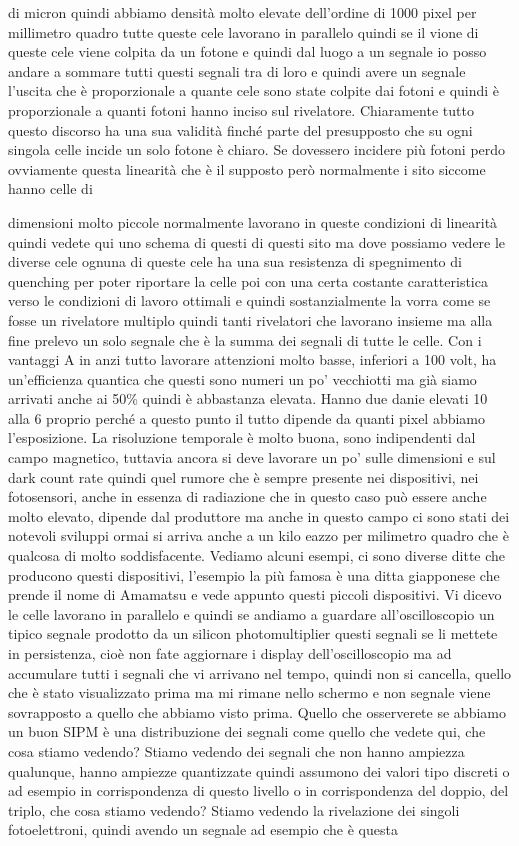 di micron quindi abbiamo densità molto elevate dell'ordine di 1000 pixel per millimetro quadro tutte queste cele lavorano in parallelo quindi se il vione di queste cele viene colpita da un fotone e quindi dal luogo a un segnale io posso andare a sommare tutti questi segnali tra di loro e quindi avere un segnale l'uscita che è proporzionale a quante cele sono state colpite dai fotoni e quindi è proporzionale a quanti fotoni hanno inciso sul rivelatore. Chiaramente tutto questo discorso ha una sua validità finché parte del presupposto che su ogni singola celle incide un solo fotone è chiaro. Se dovessero incidere più fotoni perdo ovviamente questa linearità che è il supposto però normalmente i sito siccome hanno celle di 

dimensioni molto piccole normalmente lavorano in queste condizioni di linearità quindi vedete qui uno schema di questi di questi sito ma dove possiamo vedere le diverse cele ognuna di queste cele ha una sua resistenza di spegnimento di quenching per poter riportare la celle poi con una certa costante caratteristica verso le condizioni di lavoro ottimali e quindi sostanzialmente la vorra come se fosse un rivelatore multiplo quindi tanti rivelatori che lavorano insieme ma alla fine prelevo un solo segnale che è la summa dei segnali di tutte le celle. Con i vantaggi A in anzi tutto lavorare attenzioni molto basse, inferiori a 100 volt, ha un'efficienza quantica che questi sono numeri un po' vecchiotti ma già siamo arrivati anche ai 50\% quindi è abbastanza elevata. Hanno due danie elevati 10 alla 6 proprio perché a questo punto il tutto dipende da quanti pixel abbiamo l'esposizione. La risoluzione temporale è molto buona, sono indipendenti dal campo magnetico, tuttavia ancora si deve lavorare un po' sulle dimensioni e sul dark count rate quindi quel rumore che è sempre presente nei dispositivi, nei fotosensori, anche in essenza di radiazione che in questo caso può essere anche molto elevato, dipende dal produttore ma anche in questo campo ci sono stati dei notevoli sviluppi ormai si arriva anche a un kilo eazzo per milimetro quadro che è qualcosa di molto soddisfacente. Vediamo alcuni esempi, ci sono diverse ditte che producono questi dispositivi, l'esempio la più famosa è una ditta giapponese che prende il nome di Amamatsu e vede appunto questi piccoli dispositivi. Vi dicevo le celle lavorano in parallelo e quindi se andiamo a guardare all'oscilloscopio un tipico segnale prodotto da un silicon photomultiplier questi segnali se li mettete in persistenza, cioè non fate aggiornare i display dell'oscilloscopio ma ad accumulare tutti i segnali che vi arrivano nel tempo, quindi non si cancella, quello che è stato visualizzato prima ma mi rimane nello schermo e non segnale viene sovrapposto a quello che abbiamo visto prima. Quello che osserverete se abbiamo un buon SIPM è una distribuzione dei segnali come quello che vedete qui, che cosa stiamo vedendo? Stiamo vedendo dei segnali che non hanno ampiezza qualunque, hanno ampiezze quantizzate quindi assumono dei valori tipo discreti o ad esempio in corrispondenza di questo livello o in corrispondenza del doppio, del triplo, che cosa stiamo vedendo? Stiamo vedendo la rivelazione dei singoli fotoelettroni, quindi avendo un segnale ad esempio che è questa 